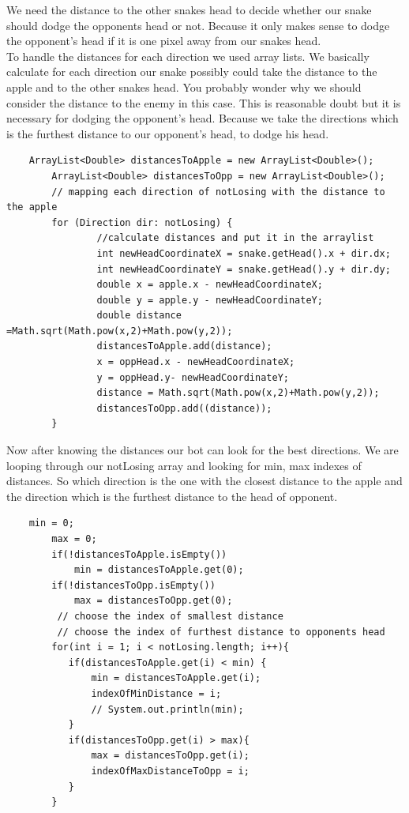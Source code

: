 \documentclass[a4paper,12pt]{article}
\begin{document}
We need the distance to the other snakes head to decide whether our snake should dodge the opponents head or not. Because it only makes sense to dodge the opponent's head if it is one pixel away from our snakes head.\\
To handle the distances for each direction we used array lists. We basically calculate for each direction our snake possibly could take the  distance to the apple and to the other snakes head. You probably wonder why we should consider the distance to the enemy in this case. This is reasonable doubt but it is necessary for dodging the opponent's head. Because we take the directions which is the furthest distance to our opponent's head, to dodge his head.\\
\begin{verbatim}
	ArrayList<Double> distancesToApple = new ArrayList<Double>();
        ArrayList<Double> distancesToOpp = new ArrayList<Double>();
        // mapping each direction of notLosing with the distance to the apple
        for (Direction dir: notLosing) {
                //calculate distances and put it in the arraylist
                int newHeadCoordinateX = snake.getHead().x + dir.dx;
                int newHeadCoordinateY = snake.getHead().y + dir.dy;
                double x = apple.x - newHeadCoordinateX;
                double y = apple.y - newHeadCoordinateY;
                double distance =Math.sqrt(Math.pow(x,2)+Math.pow(y,2));
                distancesToApple.add(distance);
                x = oppHead.x - newHeadCoordinateX;
                y = oppHead.y- newHeadCoordinateY;
                distance = Math.sqrt(Math.pow(x,2)+Math.pow(y,2));
                distancesToOpp.add((distance));
        }
\end{verbatim}
Now after knowing the distances our bot can look for the best directions. We are looping through our notLosing array and looking for min, max indexes of distances. So which direction is the one with the closest distance to the apple and the direction which is the furthest distance to the head of opponent.
\newpage
\begin{verbatim}
	min = 0;
        max = 0;
        if(!distancesToApple.isEmpty())
            min = distancesToApple.get(0);
        if(!distancesToOpp.isEmpty())
            max = distancesToOpp.get(0);
         // choose the index of smallest distance
         // choose the index of furthest distance to opponents head
        for(int i = 1; i < notLosing.length; i++){
           if(distancesToApple.get(i) < min) {
               min = distancesToApple.get(i);
               indexOfMinDistance = i;
               // System.out.println(min);
           }
           if(distancesToOpp.get(i) > max){
               max = distancesToOpp.get(i);
               indexOfMaxDistanceToOpp = i;
           }
        }
\end{verbatim}
\end{document}
